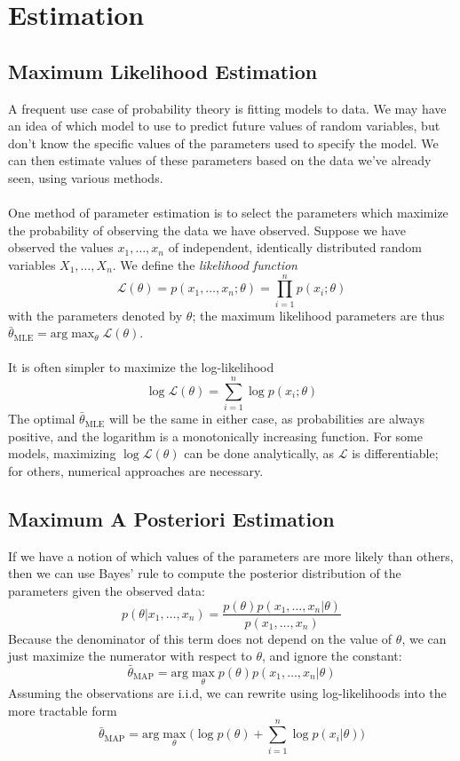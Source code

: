 \documentclass{article}
\begin{document}
\section{Estimation}

\subsection{Maximum Likelihood Estimation}
A frequent use case of probability theory is fitting models to data. We may have an idea of which model to use to predict future values of random variables, but don't know the specific values of the parameters used to specify the model. We can then estimate values of these parameters based on the data we've already seen, using various methods. \\\\
One method of parameter estimation is to select the parameters which maximize the probability of observing the data we have observed. Suppose we have observed the values $x_1, \hdots, x_n$ of independent, identically distributed random variables $X_1, \hdots, X_n$. We define the \textit{likelihood function} $$\mathcal{L}(\theta) = p(x_1, \hdots, x_n; \theta) = \prod_{i=1}^n p(x_i;\theta)$$ with the parameters denoted by $\theta$; the maximum likelihood parameters are thus $\bar{\theta}_\text{MLE} = \text{arg}\max_\theta \mathcal{L}(\theta)$. \\\\
It is often simpler to maximize the log-likelihood $$\log\mathcal{L}(\theta) = \sum_{i=1}^n \log p(x_i; \theta)$$ The optimal $\bar{\theta}_\text{MLE}$ will be the same in either case, as probabilities are always positive, and the logarithm is a monotonically increasing function. For some models, maximizing $\log \mathcal{L}(\theta)$ can be done analytically, as $\mathcal{L}$ is differentiable; for others, numerical approaches are necessary.

\subsection{Maximum A Posteriori Estimation}
If we have a notion of which values of the parameters are more likely than others, then we can use Bayes' rule to compute the posterior distribution of the parameters given the observed data: $$p(\theta | x_1, \hdots, x_n) = \frac{p(\theta)p(x_1, \hdots, x_n | \theta)}{p(x_1, \hdots, x_n)}$$
Because the denominator of this term does not depend on the value of $\theta$, we can just maximize the numerator with respect to $\theta$, and ignore the constant: $$\bar{\theta}_\text{MAP} = \text{arg}\max_\theta p(\theta)p(x_1, \hdots, x_n | \theta)$$
Assuming the observations are i.i.d, we can rewrite using log-likelihoods into the more tractable form $$\bar{\theta}_\text{MAP} = \text{arg}\max_\theta \big(\log p(\theta) + \sum_{i=1}^n \log p(x_i | \theta) \big)$$
\end{document}
